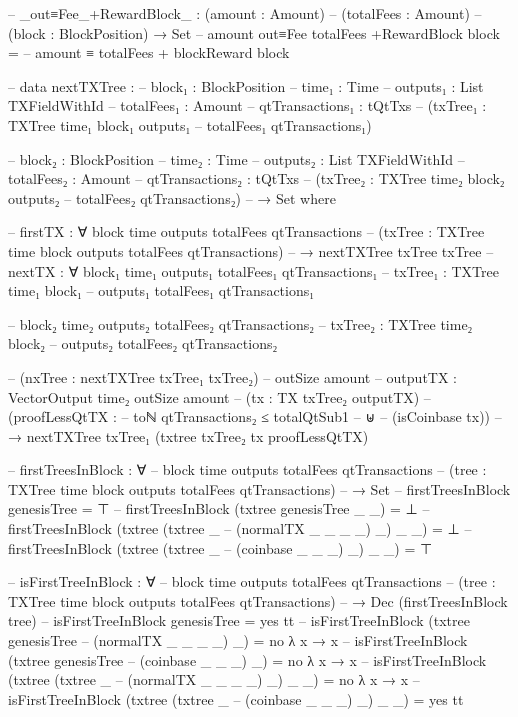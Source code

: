 \documentclass{beamer}
\begin{document}
{\begin{code}
--         _out≡Fee_+RewardBlock_ : (amount : Amount)
--           (totalFees : Amount)
--           (block : BlockPosition) → Set
--         amount out≡Fee totalFees +RewardBlock block =
--           amount ≡ totalFees + blockReward block

--       data nextTXTree :
--         {block₁ : BlockPosition}
--         {time₁ : Time}
--         {outputs₁ : List TXFieldWithId}
--         {totalFees₁ : Amount}
--         {qtTransactions₁ : tQtTxs}
--         (txTree₁ : TXTree time₁ block₁ outputs₁
--           totalFees₁ qtTransactions₁)

--         {block₂ : BlockPosition}
--         {time₂ : Time}
--         {outputs₂ : List TXFieldWithId}
--         {totalFees₂ : Amount}
--         {qtTransactions₂ : tQtTxs}
--         (txTree₂ : TXTree time₂ block₂ outputs₂
--           totalFees₂ qtTransactions₂)
--         → Set where

--         firstTX : ∀ {block time outputs totalFees qtTransactions}
--           (txTree : TXTree time block outputs totalFees qtTransactions)
--           → nextTXTree txTree txTree
--         nextTX : ∀ {block₁ time₁ outputs₁ totalFees₁ qtTransactions₁}
--           {txTree₁ : TXTree time₁ block₁
--             outputs₁ totalFees₁ qtTransactions₁}

--           {block₂ time₂ outputs₂ totalFees₂ qtTransactions₂}
--           {txTree₂ : TXTree time₂ block₂
--             outputs₂ totalFees₂ qtTransactions₂}

--           (nxTree : nextTXTree txTree₁ txTree₂)
--           {outSize amount}
--           {outputTX : VectorOutput time₂ outSize amount}
--           (tx : TX txTree₂ outputTX)
--           (proofLessQtTX :
--               toℕ qtTransactions₂ ≤ totalQtSub1
--               ⊎
--               (isCoinbase tx))
--           → nextTXTree txTree₁ (txtree txTree₂ tx proofLessQtTX)


--       firstTreesInBlock : ∀
--         {block time outputs totalFees qtTransactions}
--         (tree : TXTree time block outputs totalFees qtTransactions)
--         → Set
--       firstTreesInBlock genesisTree = ⊤
--       firstTreesInBlock (txtree genesisTree _ _) = ⊥
--       firstTreesInBlock (txtree (txtree _
--         (normalTX _ _ _ _) _) _ _) = ⊥
--       firstTreesInBlock (txtree (txtree _
--         (coinbase _ _ _) _) _ _) = ⊤


--       isFirstTreeInBlock : ∀
--         {block time outputs totalFees qtTransactions}
--         (tree : TXTree time block outputs totalFees qtTransactions)
--         → Dec (firstTreesInBlock tree)
--       isFirstTreeInBlock genesisTree = yes tt
--       isFirstTreeInBlock (txtree genesisTree
--         (normalTX _ _ _ _) _) = no λ x → x
--       isFirstTreeInBlock (txtree genesisTree
--         (coinbase _ _ _) _) = no λ x → x
--       isFirstTreeInBlock (txtree (txtree _
--         (normalTX _ _ _ _) _) _ _) = no λ x → x
--       isFirstTreeInBlock (txtree (txtree _
--         (coinbase _ _ _) _) _ _) = yes tt


\end{code}}
\end{document}
